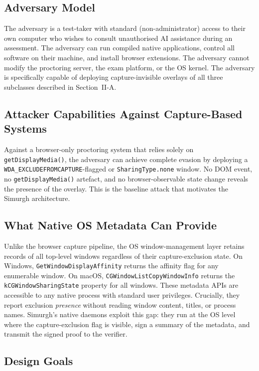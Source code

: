 \documentclass[conference]{IEEEtran}
\begin{document}
\subsection{Adversary Model}

The adversary is a test-taker with standard (non-administrator) access to their own computer who wishes to consult unauthorised AI assistance during an assessment. The adversary can run compiled native applications, control all software on their machine, and install browser extensions. The adversary cannot modify the proctoring server, the exam platform, or the OS kernel. The adversary is specifically capable of deploying capture-invisible overlays of all three subclasses described in Section~II-A.

\subsection{Attacker Capabilities Against Capture-Based Systems}

Against a browser-only proctoring system that relies solely on \texttt{getDisplayMedia()}, the adversary can achieve complete evasion by deploying a \texttt{WDA\_EXCLUDEFROMCAPTURE}-flagged or \texttt{SharingType.none} window. No DOM event, no \texttt{getDisplayMedia()} artefact, and no browser-observable state change reveals the presence of the overlay. This is the baseline attack that motivates the Simurgh architecture.

\subsection{What Native OS Metadata Can Provide}

Unlike the browser capture pipeline, the OS window-management layer retains records of all top-level windows regardless of their capture-exclusion state. On Windows, \texttt{GetWindowDisplayAffinity} returns the affinity flag for any enumerable window. On macOS, \texttt{CGWindowListCopyWindowInfo} returns the \texttt{kCGWindowSharingState} property for all windows. These metadata APIs are accessible to any native process with standard user privileges. Crucially, they report exclusion \textit{presence} without reading window content, titles, or process names. Simurgh's native daemons exploit this gap: they run at the OS level where the capture-exclusion flag is visible, sign a summary of the metadata, and transmit the signed proof to the verifier.

\subsection{Design Goals}
\end{document}
